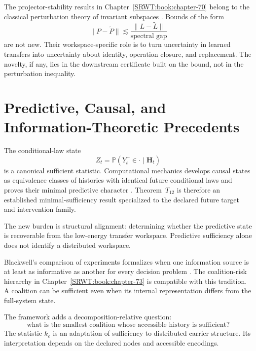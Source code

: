 
The projector-stability results in Chapter~\ref{SRWT:book:chapter-70} belong to the classical perturbation
theory of invariant subspaces \cite{SRWT:DavisKahan1970,SRWT:Kato1995}. Bounds of the
form
\[
\|P-\widetilde P\|
\lesssim
\frac{\|L-\widetilde L\|}{\text{spectral gap}}
\]
are not new. Their workspace-specific role is to turn uncertainty in learned
transfers into uncertainty about identity, operation closure, and replacement.
The novelty, if any, lies in the downstream certificate built on the bound, not
in the perturbation inequality.

\section{Predictive, Causal, and Information-Theoretic Precedents}


The conditional-law state
\[
Z_t=\mathbb P(Y_t^+\in\cdot\mid\mathbf H_t)
\]
is a canonical sufficient statistic. Computational mechanics develops causal
states as equivalence classes of histories with identical future conditional
laws and proves their minimal predictive character
\cite{SRWT:ShaliziCrutchfield2001}. Theorem~\(T_{12}\) is therefore an established
minimal-sufficiency result specialized to the declared future target and
intervention family.

The new burden is structural alignment: determining whether the predictive
state is recoverable from the low-energy transfer workspace. Predictive
sufficiency alone does not identify a distributed workspace.


Blackwell's comparison of experiments formalizes when one information source
is at least as informative as another for every decision problem
\cite{SRWT:Blackwell1953}. The coalition-risk hierarchy in Chapter~\ref{SRWT:book:chapter-73} is compatible
with this tradition. A coalition can be sufficient even when its internal
representation differs from the full-system state.

The framework adds a decomposition-relative question:
\[
\text{what is the smallest coalition whose accessible history is sufficient?}
\]
The statistic \(k_\varepsilon\) is an adaptation of sufficiency to distributed
carrier structure. Its interpretation depends on the declared nodes and
accessible encodings.

